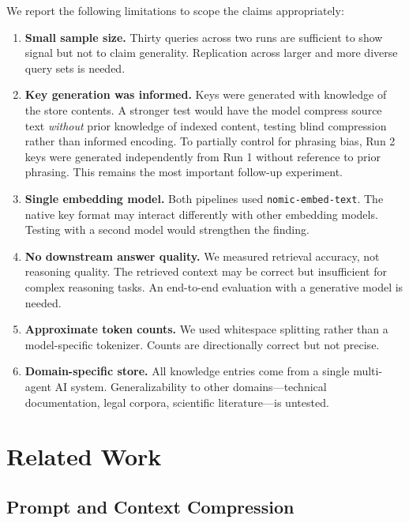 \documentclass{article}
\begin{document}
We report the following limitations to scope the claims appropriately:

\begin{enumerate}
\item \textbf{Small sample size.} Thirty queries across two runs are sufficient to show signal but not to claim generality. Replication across larger and more diverse query sets is needed.

\item \textbf{Key generation was informed.} Keys were generated with knowledge of the store contents. A stronger test would have the model compress source text \textit{without} prior knowledge of indexed content, testing blind compression rather than informed encoding. To partially control for phrasing bias, Run 2 keys were generated independently from Run 1 without reference to prior phrasing. This remains the most important follow-up experiment.

\item \textbf{Single embedding model.} Both pipelines used \texttt{nomic-embed-text}. The native key format may interact differently with other embedding models. Testing with a second model would strengthen the finding.

\item \textbf{No downstream answer quality.} We measured retrieval accuracy, not reasoning quality. The retrieved context may be correct but insufficient for complex reasoning tasks. An end-to-end evaluation with a generative model is needed.

\item \textbf{Approximate token counts.} We used whitespace splitting rather than a model-specific tokenizer. Counts are directionally correct but not precise.

\item \textbf{Domain-specific store.} All knowledge entries come from a single multi-agent AI system. Generalizability to other domains---technical documentation, legal corpora, scientific literature---is untested.
\end{enumerate}

\section{Related Work}
\label{sec:related}

\subsection{Prompt and Context Compression}
\end{document}
